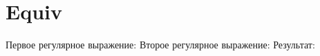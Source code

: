 \section{Equiv}
\begin{frame}{}
	Первое регулярное выражение:
Второе регулярное выражение:
	Результат:
\end{frame}

